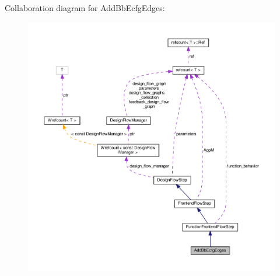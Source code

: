 Collaboration diagram for Add\+Bb\+Ecfg\+Edges\+:
\nopagebreak
\begin{figure}[H]
\begin{center}
\leavevmode
\includegraphics[width=350pt]{d0/d5a/classAddBbEcfgEdges__coll__graph}
\end{center}
\end{figure}
